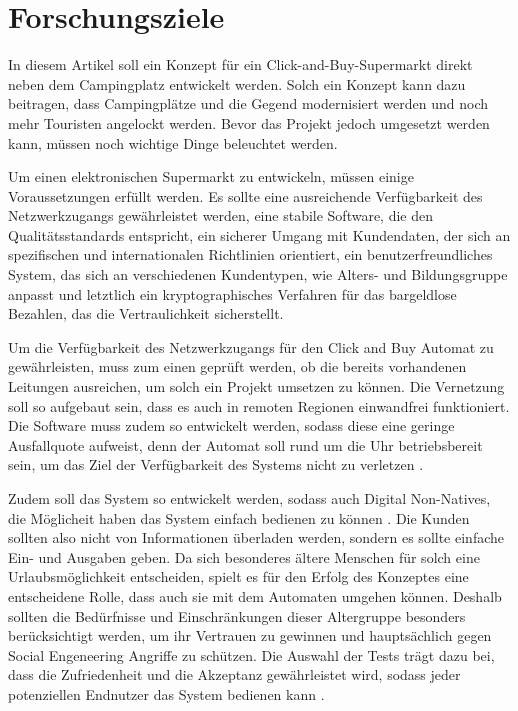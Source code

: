 \section{Forschungsziele}


In diesem Artikel soll ein Konzept für ein Click-and-Buy-Supermarkt direkt neben dem Campingplatz 
entwickelt werden. Solch ein Konzept kann dazu beitragen, dass Campingplätze und die Gegend
modernisiert werden und noch mehr Touristen angelockt werden. Bevor das Projekt jedoch umgesetzt 
werden kann, müssen noch wichtige Dinge beleuchtet werden. 


Um einen elektronischen Supermarkt zu entwickeln, müssen einige Voraussetzungen erfüllt werden.
Es sollte eine ausreichende Verfügbarkeit des Netzwerkzugangs gewährleistet werden, eine stabile 
Software, die den Qualitätsstandards entspricht, ein sicherer Umgang mit Kundendaten, der sich an 
spezifischen und internationalen Richtlinien orientiert, ein benutzerfreundliches System, das sich an 
verschiedenen Kundentypen, wie Alters- und Bildungsgruppe anpasst und letztlich ein kryptographisches
Verfahren für das bargeldlose Bezahlen, das die Vertraulichkeit sicherstellt.


Um die Verfügbarkeit des Netzwerkzugangs für den Click and Buy Automat zu gewährleisten, muss zum einen 
geprüft werden, ob die bereits vorhandenen Leitungen ausreichen, um solch ein Projekt umsetzen zu können.
Die Vernetzung soll so aufgebaut sein, dass es auch in remoten Regionen einwandfrei funktioniert. 
Die Software muss zudem so entwickelt werden, sodass diese eine geringe Ausfallquote aufweist, 
denn der Automat soll rund um die Uhr betriebsbereit sein, um das Ziel der Verfügbarkeit des
 Systems nicht zu verletzen \cite{refbook:SWIS}.


Zudem soll das System so entwickelt werden, sodass auch Digital Non-Natives, die Möglicheit 
haben das System einfach bedienen zu können \cite{refart:QWDN}. Die Kunden sollten also nicht von 
Informationen überladen werden, sondern es sollte einfache Ein- und Ausgaben geben. Da sich besonderes
ältere Menschen für solch eine Urlaubsmöglichkeit entscheiden, spielt es für den Erfolg des Konzeptes 
eine entscheidene Rolle, dass auch sie mit dem Automaten umgehen können. Deshalb sollten die Bedürfnisse
und Einschränkungen dieser Altergruppe besonders berücksichtigt werden, um ihr Vertrauen zu gewinnen
\cite{refart:HLAU} und hauptsächlich gegen Social Engeneering Angriffe zu schützen. Die Auswahl der
Tests trägt dazu bei, dass die Zufriedenheit und die Akzeptanz gewährleistet wird, sodass jeder 
potenziellen Endnutzer das System bedienen kann \cite{refbook:IASE}.


